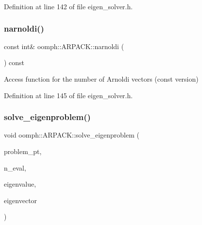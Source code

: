 Definition at line 142 of file eigen\+\_\+solver.\+h.

\mbox{\label{classoomph_1_1ARPACK_a4b7b996589dfe4f61868be9ce381a41e}} 
\subsubsection{\texorpdfstring{narnoldi()}{narnoldi()}\hspace{0.1cm}{\footnotesize\ttfamily [2/2]}}
{\footnotesize\ttfamily const int\& oomph\+::\+A\+R\+P\+A\+C\+K\+::narnoldi (\begin{DoxyParamCaption}{ }\end{DoxyParamCaption}) const\hspace{0.3cm}{\ttfamily [inline]}}



Access function for the number of Arnoldi vectors (const version) 



Definition at line 145 of file eigen\+\_\+solver.\+h.

\mbox{\label{classoomph_1_1ARPACK_ac644213623ea3d91a42cf1ea4608cdf3}} 
\subsubsection{\texorpdfstring{solve\+\_\+eigenproblem()}{solve\_eigenproblem()}}
{\footnotesize\ttfamily void oomph\+::\+A\+R\+P\+A\+C\+K\+::solve\+\_\+eigenproblem (\begin{DoxyParamCaption}\item[{\hyperlink{classoomph_1_1Problem}{Problem} $\ast$const \&}]{problem\+\_\+pt,  }\item[{const int \&}]{n\+\_\+eval,  }\item[{\hyperlink{classoomph_1_1Vector}{Vector}$<$ std\+::complex$<$ double $>$ $>$ \&}]{eigenvalue,  }\item[{\hyperlink{classoomph_1_1Vector}{Vector}$<$ \hyperlink{classoomph_1_1DoubleVector}{Double\+Vector} $>$ \&}]{eigenvector }\end{DoxyParamCaption})\hspace{0.3cm}{\ttfamily [virtual]}}



